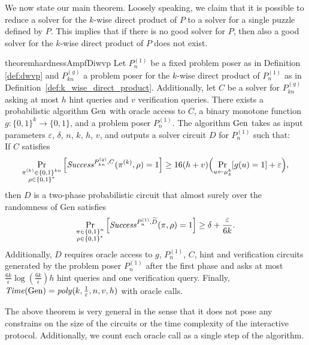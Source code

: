 We now state our main theorem. Loosely speaking, we claim that it is possible to reduce a solver for the $k$-wise direct product of $P$
to a solver for a single puzzle defined by $P$. This implies that if there is no good solver for $P$, then also a good solver for
the $k$-wise direct product of $P$ does not exist.
%
\begin{restatable}{theorem}{hardnessAmpfDiwvp}
\label{th:sec_amp_for_dwvp}
Let $P_{n}^{(1)}$ be a fixed problem poser as in Definition \ref{def:dwvp}
and $P_{kn}^{(g)}$ a problem poser for the $k$-wise direct product of $P_{n}^{(1)}$ as in Definition~\ref{def:k_wise_direct_product}.
Additionally, let $C$ be a solver for $P_{kn}^{(g)}$ asking at most $h$ hint queries and $v$ verification queries.
There exists a probabilistic algorithm $\operatorname{\text{Gen}}$ with oracle access to $C$,
a binary monotone function $g:\{0,1\}^k \rightarrow \{0,1\}$, and a problem poser $P_{n}^{(1)}$.
The algorithm $\operatorname{\text{Gen}}$ takes as input parameters $\varepsilon$, $\delta$, $n$, $k$, $h$, $v$,
and outputs a solver circuit $D$ for $P_{n}^{(1)}$ such that: \\
If $C$ satisfies
  \begin{align}
    \label{th_sec_amp_dwvp_assum}
    \underset{\substack{\pi^{(k)} \in \{0,1\}^{kn} \\ \rho \in \{0,1\}^{*}}}{\Pr}\left[\mathit{Success}^{P_{kn}^{(g)}, C}(\pi^{(k)}, \rho) = 1\right]
    \geq 16(h+v)\Bigl(\underset{u \leftarrow \mu_\delta^k}{\Pr}[g(u) = 1] + \varepsilon \Bigr),
  \end{align}
then $D$ is a two-phase probabilistic circuit that almost surely over the randomness of Gen satisfies
  \begin{align}
    \underset{\substack{\pi \in \{0,1\}^{n} \\ \rho \in \{0,1\}^{*}}}
    {\Pr}\left[\operatorname{\mathit{Success}}^{P_{n}^{(1)},\widetilde{D}}(\pi, \rho) = 1\right] \geq \delta + \frac{\varepsilon}{6k}.
  \end{align}
Additionally, $D$ requires oracle access to $g$, $P_{n}^{(1)}$, $C$, hint and verification circuits generated by the
problem poser $P_n^{(1)}$ after the first phase and asks at most $\frac{6k}{\epsilon}\log\left(\frac{6k}{\epsilon}\right) h$
hint queries and one verification query. Finally, $\operatorname{\mathit{Time}}(\operatorname{\text{Gen}}) = \operatorname{\mathit{poly}}(k, \frac{1}{\varepsilon}, n, v, h)$ with oracle calls.
\end{restatable}

The above theorem is very general in the sense that it does not pose any constrains
on the size of the circuits or the time complexity of the interactive protocol.
Additionally, we count each oracle call as a single step of the algorithm.


